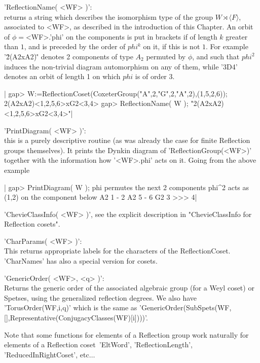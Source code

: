 'ReflectionName( <WF> )':\\ returns a string which describes the isomorphism
   type  of the  group $W\rtimes\langle  F\rangle$, associated  to <WF>, as
   described   in   the   introduction   of   this  Chapter.  An  orbit  of
   $\phi=$<WF>.'phi'  on the components is put in brackets if of length $k$
   greater than $1$, and is preceded by the order of $phi^k$ on it, if this
   is  not $1$.  For example  '\"2(A2xA2)\"' denotes  2 components  of type
   $A_2$  permuted by $\phi$, and such that $phi^2$ induces the non-trivial
   diagram  automorphism on  any of  them, while  '3D4' denotes an orbit of
   length 1 on which $phi$ is of order 3.

|    gap> W:=ReflectionCoset(CoxeterGroup("A",2,"G",2,"A",2),(1,5,2,6));
    2(A2xA2)<1,2,5,6>xG2<3,4>
    gap> ReflectionName( W );
    "2(A2xA2)<1,2,5,6>xG2<3,4>"|

'PrintDiagram( <WF> )':\\ this is  a purely  descriptive routine  (as was
     already  the case for finite  Reflection groups themselves). It prints
     the  Dynkin  diagram  of  'ReflectionGroup(<WF>)'  together  with  the
     information how '<WF>.phi' acts on it. Going from the above example\:

|    gap> PrintDiagram( W );
    phi permutes the next 2 components
    phi^2 acts as (1,2) on the component below
    A2 1 - 2
    A2 5 - 6
    G2 3 >>> 4|

'ChevieClassInfo(   <WF>   )',   see   the   explicit   description   in
"ChevieClassInfo for Reflection cosets".

'CharParams(  <WF> )':\\ This returns appropriate labels for the characters
of the ReflectionCoset. 'CharNames' has also a special version for cosets.

'GenericOrder(  <WF>, <q> )':\\ Returns the generic order of the associated
     algebraic  group (for a Weyl coset)  or Spetses, using the generalized
     reflection  degrees. We  also have  'TorusOrder(WF,i,q)' which  is the
     same as
     'GenericOrder(SubSpets(WF,[],Representative(ConjugacyClasses(WF)[i])))'.

Note  that  some  functions  for   elements  of  a  Reflection  group  work
naturally   for   elements   of  a   Reflection   coset\:\
'EltWord',    'ReflectionLength', 'ReducedInRightCoset', etc$\ldots$

